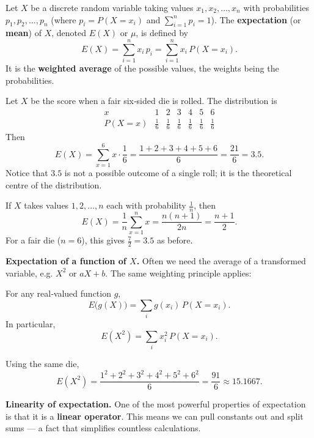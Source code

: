 \documentclass[11pt]{article}
\begin{document}
\begin{definition}
Let $X$ be a discrete random variable taking values $x_1, x_2, \dots, x_n$ with probabilities $p_1, p_2, \dots, p_n$ (where $p_i = P(X=x_i)$ and $\sum_{i=1}^n p_i = 1$). The \textbf{expectation} (or \textbf{mean}) of $X$, denoted $E(X)$ or $\mu$, is defined by
\[
E(X) = \sum_{i=1}^{n} x_i\,p_i = \sum_{i=1}^{n} x_i\,P(X=x_i).
\]
It is the \textbf{weighted average} of the possible values, the weights being the probabilities.
\end{definition}

\begin{exemplebox}
Let $X$ be the score when a fair six‑sided die is rolled. The distribution is
\[
\begin{array}{c|cccccc}
x & 1 & 2 & 3 & 4 & 5 & 6 \\ \hline
P(X=x) & \frac16 & \frac16 & \frac16 & \frac16 & \frac16 & \frac16
\end{array}
\]
Then
\[
E(X) = \sum_{x=1}^{6} x\cdot\frac16 = \frac{1+2+3+4+5+6}{6} = \frac{21}{6} = 3.5.
\]
Notice that $3.5$ is not a possible outcome of a single roll; it is the theoretical centre of the distribution.
\end{exemplebox}

\begin{exemplebox}
If $X$ takes values $1,2,\dots,n$ each with probability $\frac1n$, then
\[
E(X) = \frac{1}{n}\sum_{x=1}^n x = \frac{n(n+1)}{2n} = \frac{n+1}{2}.
\]
For a fair die ($n=6$), this gives $\frac{7}{2}=3.5$ as before.
\end{exemplebox}

\textbf{Expectation of a function of $X$.} Often we need the average of a transformed variable, e.g. $X^2$ or $aX+b$. The same weighting principle applies:

\begin{propriete}
For any real‑valued function $g$,
\[
E\bigl(g(X)\bigr) = \sum_{i} g(x_i)\,P(X=x_i).
\]
In particular,
\[
E(X^2) = \sum_{i} x_i^2\,P(X=x_i).
\]
\end{propriete}

\begin{exemplebox}
Using the same die,
\[
E(X^2) = \frac{1^2+2^2+3^2+4^2+5^2+6^2}{6} = \frac{91}{6} \approx 15.1667.
\]
\end{exemplebox}

\textbf{Linearity of expectation.} One of the most powerful properties of expectation is that it is a \textbf{linear operator}. This means we can pull constants out and split sums — a fact that simplifies countless calculations.
\end{document}
